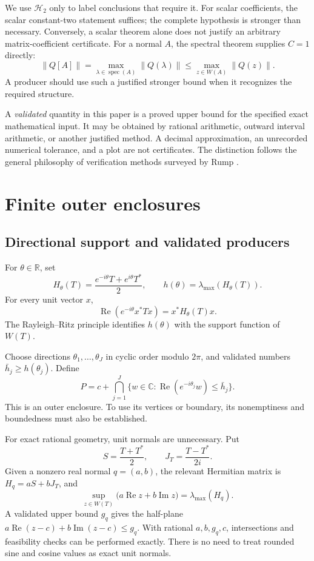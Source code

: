 \documentclass[11pt]{article}
\newcommand{\C}{\mathbb C}
\newcommand{\norm}[1]{\lVert #1\rVert}
\newcommand{\W}{W}
\newcommand{\HH}{\mathcal H}
\newcommand{\im}{\operatorname{Im}}
\newcommand{\re}{\operatorname{Re}}
\DeclareMathOperator{\spec}{spec}
\theoremstyle{definition}
\theoremstyle{remark}
\numberwithin{equation}{section}
\begin{document}
We use \(\HH_2\) only to label conclusions that require it. For scalar
coefficients, the scalar constant-two statement suffices; the complete
hypothesis is stronger than necessary. Conversely, a scalar theorem alone
does not justify an arbitrary matrix-coefficient certificate.
For a normal \(A\), the spectral theorem supplies \(C=1\) directly:
\[
 \norm{Q[A]}=\max_{\lambda\in\spec(A)}\norm{Q(\lambda)}
 \le \max_{z\in\W(A)}\norm{Q(z)}.
\]
A producer should use such a justified stronger bound when it recognizes
the required structure.

A \emph{validated} quantity in this paper is a proved upper bound for the
specified exact mathematical input. It may be obtained by rational
arithmetic, outward interval arithmetic, or another justified method.
A decimal approximation, an unrecorded numerical tolerance, and a plot are
not certificates. The distinction follows the general philosophy of
verification methods surveyed by Rump \citep{Rump2010}.

\section{Finite outer enclosures}\label{sec:enclosures}
\subsection{Directional support and validated producers}
For \(\theta\in\mathbb R\), set
\[
 H_\theta(T)=\frac{e^{-i\theta}T+e^{i\theta}T^*}{2},\qquad
 h(\theta)=\lambda_{\max}(H_\theta(T)).
\]
For every unit vector \(x\),
\[
 \re(e^{-i\theta}x^*Tx)=x^*H_\theta(T)x.
\]
The Rayleigh--Ritz principle identifies \(h(\theta)\) with the support
function of \(\W(T)\).

Choose directions \(\theta_1,\ldots,\theta_J\) in cyclic order modulo
\(2\pi\), and validated numbers \(\bar h_j\ge h(\theta_j)\). Define
\begin{equation}\label{eq:polygon}
 P=c+\bigcap_{j=1}^{J}
 \{w\in\C:\re(e^{-i\theta_j}w)\le\bar h_j\}.
\end{equation}
This is an outer enclosure. To use its vertices or boundary, its
nonemptiness and boundedness must also be established.

For exact rational geometry, unit normals are unnecessary. Put
\[
 S=\frac{T+T^*}{2},\qquad J_T=\frac{T-T^*}{2i}.
\]
Given a nonzero real normal \(q=(a,b)\), the relevant Hermitian matrix is
\(H_q=aS+bJ_T\), and
\[
 \sup_{z\in\W(T)}\bigl(a\re z+b\im z\bigr)=\lambda_{\max}(H_q).
\]
A validated upper bound \(g_q\) gives the half-plane
\(a\re(z-c)+b\im(z-c)\le g_q\).
With rational \(a,b,g_q,c\), intersections and feasibility checks can be
performed exactly. There is no need to treat rounded sine and cosine values
as exact unit normals.
\end{document}
